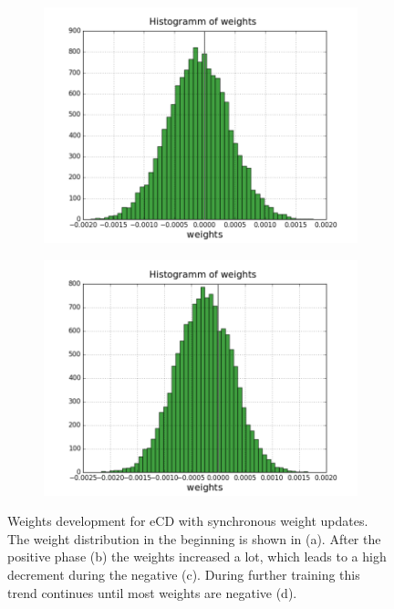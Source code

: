\begin{figure}[h!]
	\begin{subfigure}[t]{.24\textwidth}
  		\centering
  		\includegraphics[width=.9\linewidth]{imgs/app/nest/w_hist_conv3.png}
  		\caption{}
  		\label{fig:sub2}
	\end{subfigure}
	\begin{subfigure}[t]{.24\textwidth}
  		\centering
  		\includegraphics[width=.9\linewidth]{imgs/app/nest/w_hist_conv4.png}
  		\caption{}
  		\label{fig:sub2}
	\end{subfigure}
	\caption[Weights development for eCD with synchronous weight updates.]{Weights development for eCD with synchronous weight updates. The weight distribution in the beginning is shown in (a). After the positive phase (b) the weights increased a lot, which leads to a high decrement during the negative (c). During further training this trend continues until most weights are negative (d).}
	\label{fig:ecdnestconv}
\end{figure}

